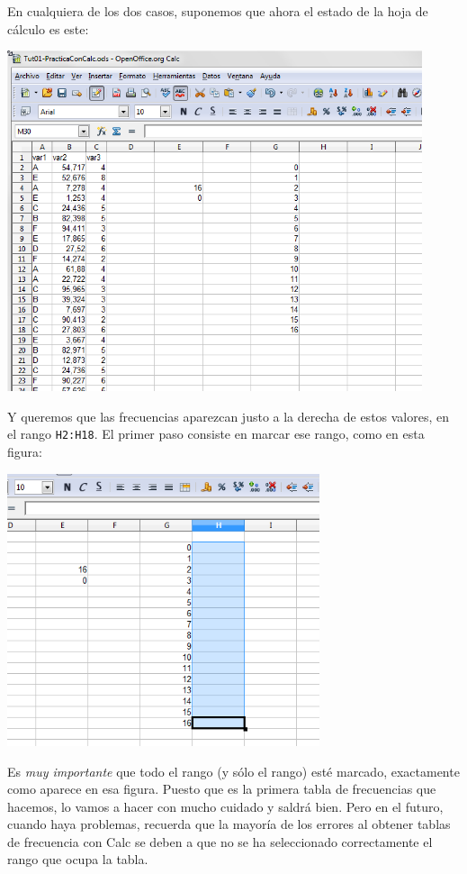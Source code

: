 \documentclass[10pt,a4paper]{article}\usepackage[]{graphicx}\usepackage[]{color}
\begin{document}
En cualquiera de los dos casos, suponemos que ahora el estado de la hoja de cálculo es este:
    \begin{center}
    \includegraphics[height=10cm]{../fig/Tut01-Calc-tablaFrec-12.png}
    \end{center}
Y queremos que las frecuencias aparezcan justo a la derecha de estos valores, en el rango {\tt H2:H18}. El primer paso consiste en marcar ese rango, como en esta figura:
    \begin{center}
    \includegraphics[height=8cm]{../fig/Tut01-Calc-tablaFrec-13.png}
    \end{center}
Es {\em muy importante} que todo el rango (y sólo el rango) esté marcado, exactamente como aparece en esa figura. Puesto que es la primera tabla de frecuencias que hacemos, lo vamos a hacer con mucho cuidado y saldrá bien. Pero en el futuro, cuando haya problemas, recuerda que la mayoría de los errores al obtener tablas de frecuencia con Calc se deben a que no se ha seleccionado correctamente el rango que ocupa la tabla.
\end{document}
